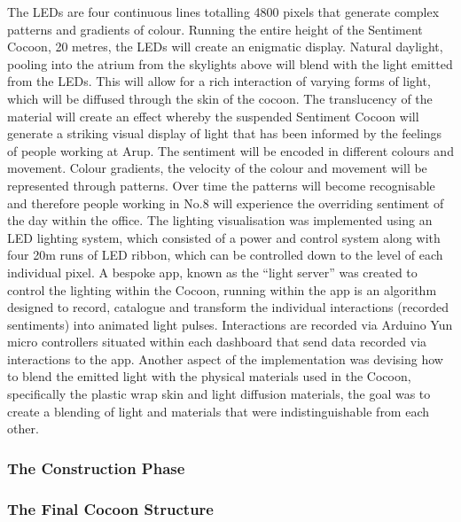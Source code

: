 The LEDs are four continuous lines totalling 4800 pixels that generate complex patterns and gradients of colour. Running the entire height of the Sentiment Cocoon, 20 metres, the LEDs will create an enigmatic display. Natural daylight, pooling into the atrium from the skylights above will blend with the light emitted from the LEDs. This will allow for a rich interaction of varying forms of light, which will be diffused through the skin of the cocoon. The translucency of the material will create an effect whereby the suspended Sentiment Cocoon will generate a striking visual display of light that has been informed by the feelings of people working at Arup. The sentiment will be encoded in different colours and movement. Colour gradients, the velocity of the colour and movement will be represented through patterns. Over time the patterns will become recognisable and therefore people working in No.8 will experience the overriding sentiment of the day within the office.
The lighting visualisation was implemented using an LED lighting system, which consisted of a power and control system along with four 20m runs of LED ribbon, which can be controlled down to the level of each individual pixel. A bespoke app, known as the “light server” was created to control the lighting within the Cocoon, running within the app is an algorithm designed to record, catalogue and transform the individual interactions (recorded sentiments) into animated light pulses. Interactions are recorded via Arduino Yun micro controllers situated within each dashboard that send data recorded via interactions to the app. Another aspect of the implementation was devising how to blend the emitted light with the physical materials used in the Cocoon, specifically the plastic wrap skin and light diffusion materials, the goal was to create a blending of light and materials that were indistinguishable from each other.

\subsubsection{The Construction Phase}

\subsubsection*{The Final Cocoon Structure}

